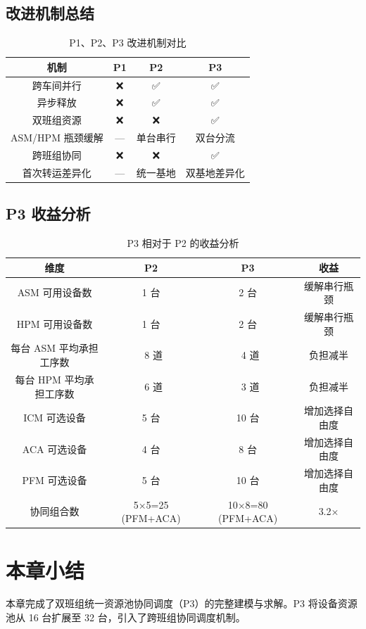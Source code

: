 \documentclass[UTF8,a4paper,12pt]{ctexart}
\begin{document}
\subsection{改进机制总结}
\begin{table}[htbp]
  \centering
  \caption{P1、P2、P3 改进机制对比}
  \label{tab:three_mechanism}
  \begin{tabular}{cccc}
    \toprule
    机制 & P1 & P2 & P3 \\
    \midrule
    跨车间并行 & ❌ & ✅ & ✅ \\
    异步释放 & ❌ & ✅ & ✅ \\
    双班组资源 & ❌ & ❌ & ✅ \\
    ASM/HPM 瓶颈缓解 & — & 单台串行 & 双台分流 \\
    跨班组协同 & ❌ & ❌ & ✅ \\
    首次转运差异化 & — & 统一基地 & 双基地差异化 \\
    \bottomrule
  \end{tabular}
\end{table}

\subsection{P3 收益分析}
\begin{table}[htbp]
  \centering
  \caption{P3 相对于 P2 的收益分析}
  \label{tab:p3_profit}
  \begin{tabular}{cccc}
    \toprule
    维度 & P2 & P3 & 收益 \\
    \midrule
    ASM 可用设备数 & 1 台 & 2 台 & 缓解串行瓶颈 \\
    HPM 可用设备数 & 1 台 & 2 台 & 缓解串行瓶颈 \\
    每台 ASM 平均承担工序数 & ~8 道 & ~4 道 & 负担减半 \\
    每台 HPM 平均承担工序数 & ~6 道 & ~3 道 & 负担减半 \\
    ICM 可选设备 & 5 台 & 10 台 & 增加选择自由度 \\
    ACA 可选设备 & 4 台 & 8 台 & 增加选择自由度 \\
    PFM 可选设备 & 5 台 & 10 台 & 增加选择自由度 \\
    协同组合数 & 5×5=25 (PFM+ACA) & 10×8=80 (PFM+ACA) & 3.2× \\
    \bottomrule
  \end{tabular}
\end{table}

\section{本章小结}
本章完成了双班组统一资源池协同调度（P3）的完整建模与求解。P3 将设备资源池从 16 台扩展至 32 台，引入了跨班组协同调度机制。
\end{document}
